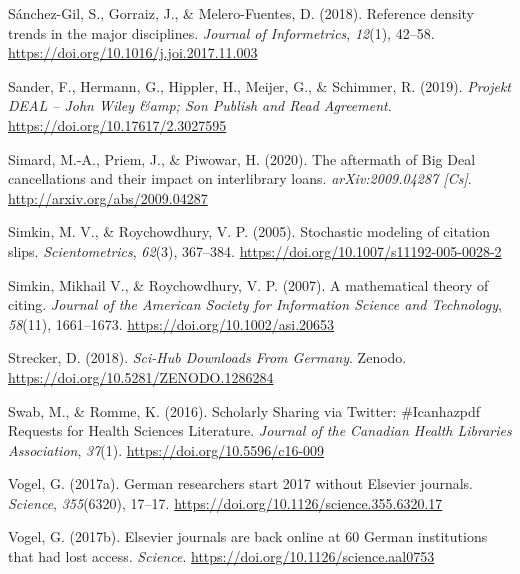 \documentclass[
]{article}
\newlength{\cslhangindent}
\newlength{\cslentryspacingunit} %
\newenvironment{CSLReferences}[2] %
 {%
  \setlength{\parindent}{0pt}
  \ifodd #1
  \let\oldpar\par
  \def\par{\hangindent=\cslhangindent\oldpar}
  \fi
  \setlength{\parskip}{#2\cslentryspacingunit}
 }%
 {}
\begin{document}
\begin{CSLReferences}{1}{0}
\leavevmode{}%
Sánchez-Gil, S., Gorraiz, J., \& Melero-Fuentes, D. (2018). Reference density trends in the major disciplines. \emph{Journal of Informetrics}, \emph{12}(1), 42--58. \url{https://doi.org/10.1016/j.joi.2017.11.003}

\leavevmode{}%
Sander, F., Hermann, G., Hippler, H., Meijer, G., \& Schimmer, R. (2019). \emph{Projekt {DEAL} -- {John} {Wiley} \&amp; {Son} {Publish} and {Read} {Agreement}}. \url{https://doi.org/10.17617/2.3027595}

\leavevmode{}%
Simard, M.-A., Priem, J., \& Piwowar, H. (2020). The aftermath of {Big} {Deal} cancellations and their impact on interlibrary loans. \emph{arXiv:2009.04287 {[}Cs{]}}. \url{http://arxiv.org/abs/2009.04287}

\leavevmode{}%
Simkin, M. V., \& Roychowdhury, V. P. (2005). Stochastic modeling of citation slips. \emph{Scientometrics}, \emph{62}(3), 367--384. \url{https://doi.org/10.1007/s11192-005-0028-2}

\leavevmode{}%
Simkin, Mikhail V., \& Roychowdhury, V. P. (2007). A mathematical theory of citing. \emph{Journal of the American Society for Information Science and Technology}, \emph{58}(11), 1661--1673. \url{https://doi.org/10.1002/asi.20653}

\leavevmode{}%
Strecker, D. (2018). \emph{Sci-{Hub} {Downloads} {From} {Germany}}. Zenodo. \url{https://doi.org/10.5281/ZENODO.1286284}

\leavevmode{}%
Swab, M., \& Romme, K. (2016). Scholarly {Sharing} via {Twitter}: \#Icanhazpdf {Requests} for {Health} {Sciences} {Literature}. \emph{Journal of the Canadian Health Libraries Association}, \emph{37}(1). \url{https://doi.org/10.5596/c16-009}

\leavevmode{}%
Vogel, G. (2017a). German researchers start 2017 without {Elsevier} journals. \emph{Science}, \emph{355}(6320), 17--17. \url{https://doi.org/10.1126/science.355.6320.17}

\leavevmode{}%
Vogel, G. (2017b). Elsevier journals are back online at 60 {German} institutions that had lost access. \emph{Science}. \url{https://doi.org/10.1126/science.aal0753}


\end{CSLReferences}
\end{document}
